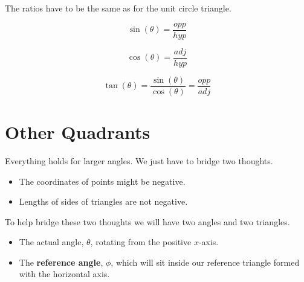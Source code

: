 \documentclass{ximera}
\begin{document}
\begin{image}[3in]
  \end{image}


The ratios have to be the same as for the unit circle triangle.


\[   \sin(\theta) = \frac{opp}{hyp}           \]



\[   \cos(\theta) = \frac{adj}{hyp}           \]




\[   \tan(\theta) = \frac{\sin(\theta)}{\cos(\theta)}    = \frac{opp}{adj}        \]








\section*{Other Quadrants}


Everything holds for larger angles.  We just have to bridge two thoughts.  


\begin{itemize}
\item The coordinates of points might be negative.  
\item Lengths of sides of triangles are not negative.
\end{itemize}

To help bridge these two thoughts we will have two angles and two triangles.  


\begin{itemize}
\item The actual angle, $\theta$, rotating from the positive $x$-axis.  
\item The \textbf{reference angle}, $\phi$, which will sit inside our reference triangle formed with the horizontal axis.
\end{itemize}
\end{document}
